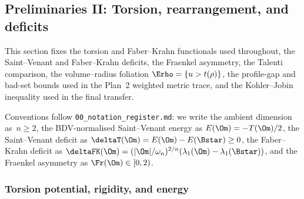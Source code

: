 %
%
%
%
%

\subsection{Preliminaries II: Torsion, rearrangement, and deficits}
\label{sec:prelim-torsion}

This section fixes the torsion and Faber--Krahn functionals used
throughout, the Saint--Venant and Faber--Krahn deficits, the Fraenkel
asymmetry, the Talenti comparison, the volume--radius foliation
$\Erho=\{u>t(\rho)\}$, the profile-gap and bad-set bounds used in the
Plan~2 weighted metric trace, and the Kohler--Jobin inequality used in
the final transfer.

Conventions follow \texttt{00\_notation\_register.md}: we write the
ambient dimension as~$n\ge 2$, the BDV-normalised Saint--Venant energy
as $E(\Om)=-T(\Om)/2$, the Saint--Venant deficit as
$\deltaT(\Om)=E(\Om)-E(\Bstar)\ge 0$, the Faber--Krahn deficit as
$\deltaFK(\Om)=(|\Om|/\omega_n)^{2/n}(\lambda_1(\Om)-\lambda_1(\Bstar))$,
and the Fraenkel asymmetry as $\Fr(\Om)\in[0,2)$.

\subsubsection{Torsion potential, rigidity, and energy}
\label{ssec:torsion}

